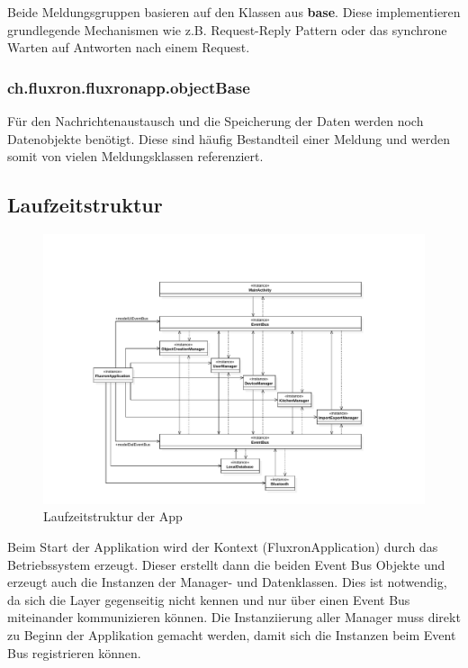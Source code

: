 Beide Meldungsgruppen basieren auf den Klassen aus \textbf{base}. Diese implementieren grundlegende Mechanismen wie z.B. Request-Reply Pattern oder das synchrone Warten auf Antworten nach einem Request.

\subsubsection{ch.fluxron.fluxronapp.objectBase}
Für den Nachrichtenaustausch und die Speicherung der Daten werden noch Datenobjekte benötigt. Diese sind häufig Bestandteil einer Meldung und werden somit von vielen Meldungsklassen referenziert.

\subsection{Laufzeitstruktur}
\begin{figure}[H]
    \begin{center}
        \includegraphics[trim=100 30 0 90,clip,scale=0.7]{results/res/instances}
    \end{center}
    \caption{Laufzeitstruktur der App}
    \label{abb:instances}
\end{figure}

Beim Start der Applikation wird der Kontext (FluxronApplication) durch das Betriebssystem  erzeugt. Dieser erstellt dann die beiden Event Bus Objekte und erzeugt auch die Instanzen der Manager- und Datenklassen. Dies ist notwendig, da sich die Layer gegenseitig nicht kennen und nur über einen Event Bus miteinander kommunizieren können. Die Instanziierung aller Manager muss direkt zu Beginn der Applikation gemacht werden, damit sich die Instanzen beim Event Bus registrieren können.

